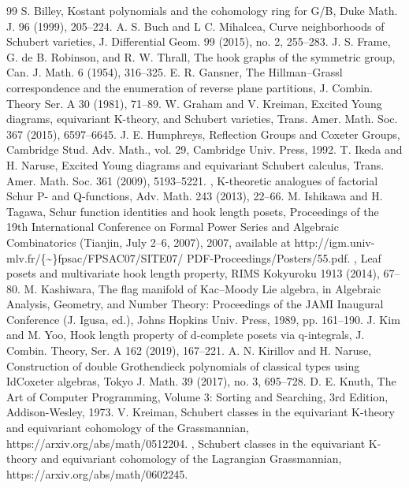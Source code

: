 \documentclass[10pt]{amsart}
\theoremstyle{definition}
\theoremstyle{remark}
\begin{document}
\begin{thebibliography}{99}
 S. Billey, Kostant polynomials and the cohomology ring for G/B, Duke Math. J. 96 (1999), 205–224.
 A. S. Buch and L C. Mihalcea, Curve neighborhoods of Schubert varieties, J. Differential Geom. 99 (2015), no. 2, 255–283.
 J. S. Frame, G. de B. Robinson, and R. W. Thrall, The hook graphs of the symmetric group, Can. J. Math. 6 (1954), 316–325.
 E. R. Gansner, The Hillman–Grassl correspondence and the enumeration of reverse plane partitions, J. Combin. Theory Ser. A 30 (1981), 71–89.
 W. Graham and V. Kreiman, Excited Young diagrams, equivariant K-theory, and Schubert varieties, Trans. Amer. Math. Soc. 367 (2015), 6597–6645.
 J. E. Humphreys, Reflection Groups and Coxeter Groups, Cambridge Stud. Adv. Math., vol. 29, Cambridge Univ. Press, 1992.
 T. Ikeda and H. Naruse, Excited Young diagrams and equivariant Schubert calculus, Trans. Amer. Math. Soc. 361 (2009), 5193–5221.
 , K-theoretic analogues of factorial Schur P- and Q-functions, Adv. Math. 243 (2013), 22–66.
 M. Ishikawa and H. Tagawa, Schur function identities and hook length posets, Proceedings of the 19th International Conference on Formal Power Series and Algebraic Combinatorics (Tianjin, July 2–6, 2007), 2007, available at http://igm.univ-mlv.fr/\{\textasciitilde{}\}fpsac/FPSAC07/SITE07/ PDF-Proceedings/Posters/55.pdf.
 , Leaf posets and multivariate hook length property, RIMS Kokyuroku 1913 (2014), 67– 80.
 M. Kashiwara, The flag manifold of Kac–Moody Lie algebra, in Algebraic Analysis, Geometry, and Number Theory: Proceedings of the JAMI Inaugural Conference (J. Igusa, ed.), Johns Hopkins Univ. Press, 1989, pp. 161–190.
 J. Kim and M. Yoo, Hook length property of d-complete posets via q-integrals, J. Combin. Theory, Ser. A 162 (2019), 167–221.
 A. N. Kirillov and H. Naruse, Construction of double Grothendieck polynomials of classical types using IdCoxeter algebras, Tokyo J. Math. 39 (2017), no. 3, 695–728.
 D. E. Knuth, The Art of Computer Programming, Volume 3: Sorting and Searching, 3rd Edition, Addison-Wesley, 1973.
 V. Kreiman, Schubert classes in the equivariant K-theory and equivariant cohomology of the Grassmannian, https://arxiv.org/abs/math/0512204.
 , Schubert classes in the equivariant K-theory and equivariant cohomology of the Lagrangian Grassmannian, https://arxiv.org/abs/math/0602245.

\end{thebibliography}
\end{document}
